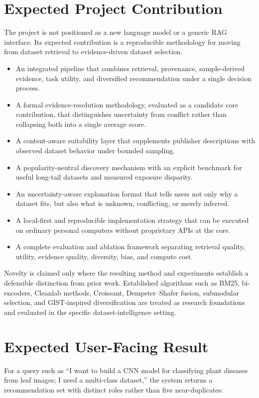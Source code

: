 \documentclass[11pt]{article}
\begin{document}
\section{Expected Project Contribution}
The project is not positioned as a new language model or a generic RAG interface. Its expected contribution
is a reproducible methodology for moving from dataset retrieval to evidence-driven dataset selection.

\begin{itemize}[leftmargin=*]
\item An integrated pipeline that combines retrieval, provenance, sample-derived evidence, task utility,
      and diversified recommendation under a single decision process.
\item A formal evidence-resolution methodology, evaluated as a candidate core contribution, that
      distinguishes uncertainty from conflict rather than collapsing both into a single average score.
\item A content-aware suitability layer that supplements publisher descriptions with observed dataset
      behavior under bounded sampling.
\item A popularity-neutral discovery mechanism with an explicit benchmark for useful long-tail datasets and
      measured exposure disparity.
\item An uncertainty-aware explanation format that tells users not only why a dataset fits, but also what
      is unknown, conflicting, or merely inferred.
\item A local-first and reproducible implementation strategy that can be executed on ordinary personal
      computers without proprietary APIs at the core.
\item A complete evaluation and ablation framework separating retrieval quality, utility, evidence quality,
      diversity, bias, and compute cost.
\end{itemize}

Novelty is claimed only where the resulting method and experiments establish a defensible distinction from
prior work. Established algorithms such as BM25, bi-encoders, Cleanlab methods, Croissant, Dempster--Shafer
fusion, submodular selection, and GIST-inspired diversification are treated as research foundations and
evaluated in the specific dataset-intelligence setting.

\section{Expected User-Facing Result}
For a query such as ``I want to build a CNN model for classifying plant diseases from leaf images; I need a
multi-class dataset,'' the system returns a recommendation set with distinct roles rather than five
near-duplicates:
\end{document}
